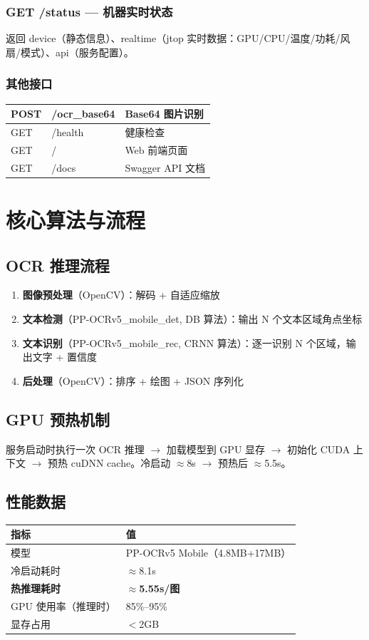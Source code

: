\documentclass[12pt,a4paper]{ctexart}
\begin{document}
\subsubsection{GET /status — 机器实时状态}
返回 device（静态信息）、realtime（jtop 实时数据：GPU/CPU/温度/功耗/风扇/模式）、api（服务配置）。

\subsubsection{其他接口}
\begin{longtable}{|p{2.5cm}|p{4cm}|p{6.5cm}|}\hline
POST & /ocr\_base64 & Base64 图片识别 \\\hline
GET & /health & 健康检查 \\\hline
GET & / & Web 前端页面 \\\hline
GET & /docs & Swagger API 文档 \\\hline
\end{longtable}

\section{核心算法与流程}

\subsection{OCR 推理流程}
\begin{enumerate}
    \item \textbf{图像预处理}（OpenCV）：解码 + 自适应缩放
    \item \textbf{文本检测}（PP-OCRv5\_mobile\_det, DB 算法）：输出 N 个文本区域角点坐标
    \item \textbf{文本识别}（PP-OCRv5\_mobile\_rec, CRNN 算法）：逐一识别 N 个区域，输出文字 + 置信度
    \item \textbf{后处理}（OpenCV）：排序 + 绘图 + JSON 序列化
\end{enumerate}

\subsection{GPU 预热机制}
服务启动时执行一次 OCR 推理 $\rightarrow$ 加载模型到 GPU 显存 $\rightarrow$ 初始化 CUDA 上下文 $\rightarrow$ 预热 cuDNN cache。冷启动 $\approx$8s $\rightarrow$ 预热后 $\approx$5.5s。

\subsection{性能数据}
\begin{longtable}{|p{6cm}|p{7cm}|}\hline
\textbf{指标} & \textbf{值} \\\hline
模型 & PP-OCRv5 Mobile（4.8MB+17MB） \\\hline
冷启动耗时 & $\approx$8.1s \\\hline
\textbf{热推理耗时} & \textbf{$\approx$5.55s/图} \\\hline
GPU 使用率（推理时） & 85\%--95\% \\\hline
显存占用 & $<$2GB \\\hline
\end{longtable}
\end{document}
